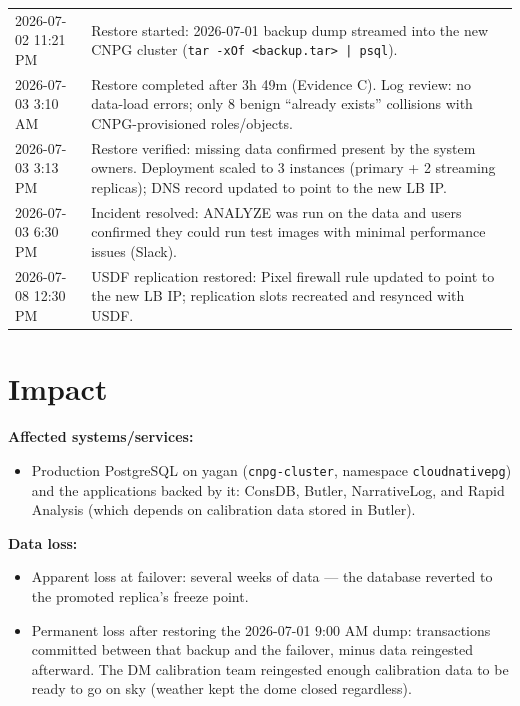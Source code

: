 \documentclass[PMO,authoryear,toc]{lsstdoc}
\begin{document}
\begin{longtable}{p{}p{}}
2026-07-02 11:21 PM & Restore started: 2026-07-01 backup dump streamed into
  the new CNPG cluster (\texttt{tar -xOf <backup.tar> | psql}). \\
2026-07-03 3:10 AM & Restore completed after 3h 49m (Evidence C). Log review:
  no data-load errors; only 8 benign ``already exists'' collisions with
  CNPG-provisioned roles/objects. \\
2026-07-03 3:13 PM & Restore verified: missing data confirmed present by the
  system owners. Deployment scaled to 3 instances (primary + 2 streaming
  replicas); DNS record updated to point to the new LB IP. \\
2026-07-03 6:30 PM & Incident resolved: ANALYZE was run on the data and users
  confirmed they could run test images with minimal performance issues
  (Slack). \\
2026-07-08 12:30 PM & USDF replication restored: Pixel firewall rule updated
  to point to the new LB IP; replication slots recreated and resynced with
  USDF. \\
\hline
\end{longtable}

\section{Impact}

\textbf{Affected systems/services:}

\begin{itemize}
  \item Production PostgreSQL on yagan (\texttt{cnpg-cluster}, namespace
        \texttt{cloudnativepg}) and the applications backed by it: ConsDB,
        Butler, NarrativeLog, and Rapid Analysis (which depends on calibration
        data stored in Butler).
\end{itemize}

\textbf{Data loss:}

\begin{itemize}
  \item Apparent loss at failover: several weeks of data --- the database
        reverted to the promoted replica's freeze point.
  \item Permanent loss after restoring the 2026-07-01 9:00 AM dump:
        transactions committed between that backup and the failover, minus
        data reingested afterward. The DM calibration team reingested enough
        calibration data to be ready to go on sky (weather kept the dome
        closed regardless).
\end{itemize}
\end{document}
